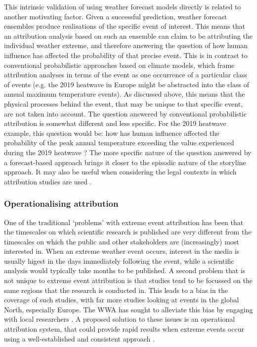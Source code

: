     This intrinsic validation of using weather forecast models directly is related to another motivating factor. Given a successful prediction, weather forecast ensembles produce realisations of the specific event of interest. This means that an attribution analysis based on such an ensemble can claim to be attributing the individual weather extreme, and therefore answering the question of how human influence has affected the probability of that precise event. This is in contrast to conventional probabilistic approaches based on climate models, which frame attribution analyses in terms of the event as one occurrence of a particular class of events (e.g. the 2019 heatwave in Europe might be abstracted into the class of annual maximum temperature events). As discussed above, this means that the physical processes behind the event, that may be unique to that specific event, are not taken into account. The question answered by conventional probabilistic attribution is somewhat different and less specific. For the 2019 heatwave example, this question would be: how has human influence affected the probability of the peak annual temperature exceeding the value experienced during the 2019 heatwave \citep{vautard_human_2020}? The more specific nature of the question answered by a forecast-based approach brings it closer to the episodic nature of the storyline approach. It may also be useful when considering the legal contexts in which attribution studies are used \citep{lloyd_climate_2021-1}.

    \subsubsection{Operationalising attribution}

      One of the traditional `problems' with extreme event attribution has been that the timescales on which scientific research is published are very different from the timescales on which the public and other stakeholders are (increasingly) most interested in. When an extreme weather event occurs, interest in the media is usually higest in the days immediately following the event, while a scientific analysis would typically take months to be published. A second problem that is not unique to extreme event attribution is that studies tend to be focussed on the same regions that the research is conducted in. This leads to a bias in the coverage of such studies, with far more studies looking at events in the global North, especially Europe. The WWA has sought to alleviate this bias by engaging with local researchers \citep{van_oldenborgh_pathways_2021}. A proposed solution to these issues is an operational attribution system, that could provide rapid results when extreme events occur using a well-established and consistent approach \citep{national_academies_of_sciences_engineering_and_medicine_attribution_2016}.

